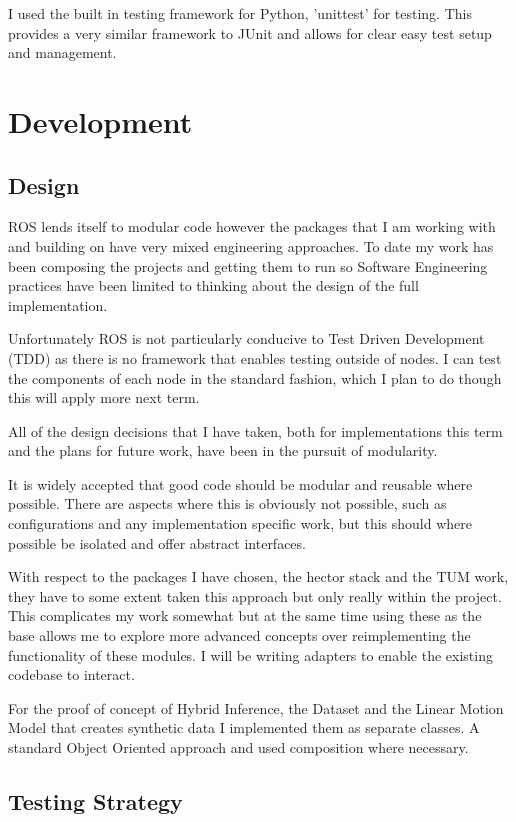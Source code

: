 \documentclass[]{../resources/final_report}
\begin{document}
I used the built in testing framework for Python, 'unittest' for testing. This provides a very 
similar framework to JUnit and allows for clear easy test setup and management.

\pagebreak
\section{Development}

\subsection{Design}
ROS lends itself to modular code however the packages that I am working with and building on have 
very mixed engineering approaches. To date my work has been composing the projects and getting them 
to run so Software Engineering practices have been limited to thinking about the design of the full 
implementation.

Unfortunately ROS is not particularly conducive to Test Driven Development (TDD) as there is no 
framework that enables testing outside of nodes. I can test the components of each node in the 
standard fashion, which I plan to do though this will apply more next term.

All of the design decisions that I have taken, both for implementations this term and the plans 
for future work, have been in the pursuit of modularity.

It is widely accepted that good code should be modular and reusable where possible. There are 
aspects where this is obviously not possible, such as configurations and any implementation 
specific work, but this should where possible be isolated and offer abstract interfaces.

With respect to the packages I have chosen, the hector stack and the TUM work, they have to some 
extent taken this approach but only really within the project. 
This complicates my work somewhat but at the same time using these as the base allows me to explore
 more advanced concepts over reimplementing the functionality of these modules.
I will be writing adapters to enable the existing codebase to interact.

For the proof of concept of Hybrid Inference, the Dataset and the Linear Motion Model that creates 
synthetic data I implemented them as separate classes. A standard Object Oriented approach and used
composition where necessary.


\subsection{Testing Strategy}
\end{document}
